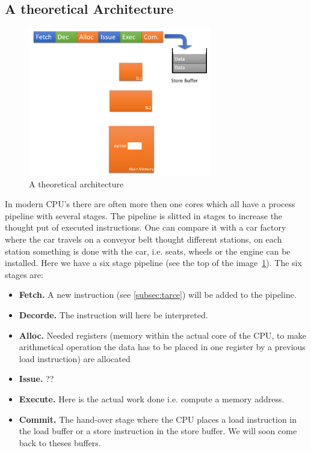 \subsection{A theoretical Architecture}
\label{subsec:TA}
\begin{figure}[h]
\centering
\includegraphics[width=8cm]{figure/thoeratical-arc.PNG}
\caption{A theoretical architecture}
\label{img:arc}
\end{figure}
In modern CPU's there are often more then one cores which all have a process pipeline with several stages. The pipeline is slitted in stages to increase the thought put of executed instructions. One can compare it with a car factory where the car travels on a conveyor belt thought different stations, on each station something is done with the car, i.e. seats, wheels or the engine can be installed. Here we have a six stage pipeline (see the top of the image~\ref{img:arc}). The six stages are:
 \begin{itemize}
   \item \textbf{Fetch.} A new instruction (see \ref{subsec:tarce}) will be added to the pipeline.
   \item \textbf{Decorde.} The instruction will here be interpreted.
   \item \textbf{Alloc.} Needed registers (memory within the actual core of the CPU, to make arithmetical operation the data has to be placed in one register by a previous load instruction) are allocated
   \item \textbf{Issue.} ??
   \item \textbf{Execute.} Here is the actual work done i.e. compute a memory address. 
   \item \textbf{Commit.} The hand-over stage where the CPU places a load instruction in the load buffer or a store instruction in the store buffer. We will soon come back to theses buffers. 
 \end{itemize}
